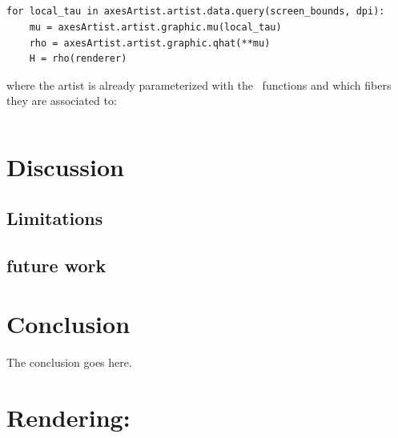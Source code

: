 \documentclass[10pt,journal,compsoc]{IEEEtran}
\theoremstyle{definition}
\theoremstyle{remark}
\begin{document}
\subsection{\vartist}
\begin{verbatim}
for local_tau in axesArtist.artist.data.query(screen_bounds, dpi):
    mu = axesArtist.artist.graphic.mu(local_tau)
    rho = axesArtist.artist.graphic.qhat(**mu)
    H = rho(renderer)
\end{verbatim}

where the artist is already parameterized with the \vindex\ functions and which fibers they are associated to:

\begin{verbatim}
\end{verbatim}


\subsubsection{\vindex}
\subsubsection{\vchannel}
\subsubsection{\vmarkd}



\section{Discussion}
\subsection{Limitations}
\subsection{future work}

\section{Conclusion}
The conclusion goes here.


\appendices
\section{Rendering: \gsection}
\end{document}
